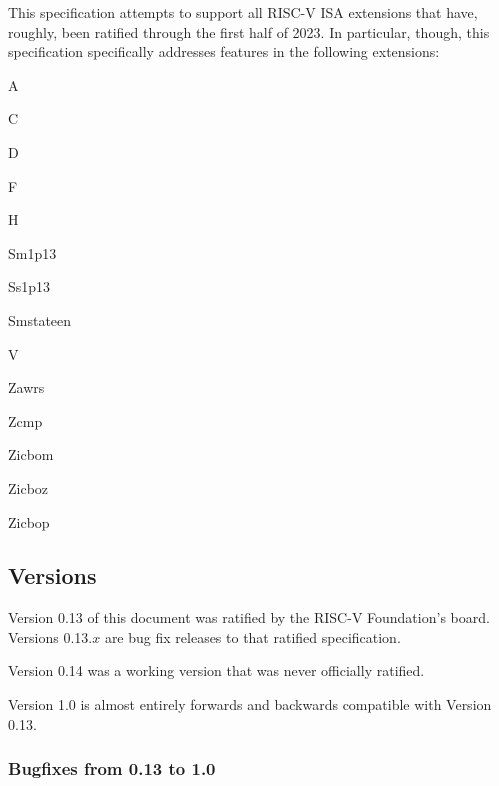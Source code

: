 \begin{steps}{This specification attempts to support all RISC-V ISA extensions
that have, roughly, been ratified through the first half of 2023.  In
particular, though, this specification specifically addresses features in the
following extensions:}
\item A %
\item C %
\item D %
\item F %
\item H %
\item Sm1p13 %
\item Ss1p13 %
\item Smstateen %
\item V %
\item Zawrs %
\item Zcmp %
\item Zicbom %
\item Zicboz %
\item Zicbop %
\end{steps}

\subsection{Versions}

Version 0.13 of this document was ratified by the RISC-V Foundation's board.
Versions 0.13.$x$ are bug fix releases to that ratified specification.

Version 0.14 was a working version that was never officially ratified.

Version 1.0 is almost entirely forwards and backwards compatible with Version 0.13.

\newcommand{\PR}[1]{\href{https://github.com/riscv/riscv-debug-spec/pull/#1}{\##1}}

\subsubsection{Bugfixes from 0.13 to 1.0}

